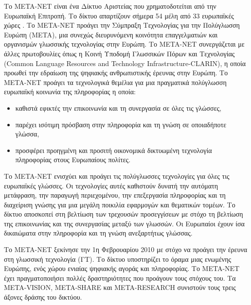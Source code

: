 \documentclass[]{../../metanetpaper}
\begin{document}
\begin{multicols}{2}
Το META-NET είναι ένα Δίκτυο Αριστείας που χρηματοδοτείται από την Ευρωπαϊκή Επιτροπή. Το δίκτυο απαρτίζουν σήμερα 54 μέλη από 33 ευρωπαϊκές χώρες \cite{rehm2011}. Το META-NET προάγει την Σύμπραξη Τεχνολογίας για την Πολύγλωσση Ευρώπη (META), μια συνεχώς διευρυνόμενη κοινότητα επαγγελματιών και οργανισμών γλωσσικής τεχνολογίας στην Ευρώπη. 
Το META-NET συνεργάζεται με άλλες πρωτοβουλίες όπως η Κοινή Υποδομή Γλωσσικών Πόρων και Τεχνολογίας (Common Language Resources and Technology Infrastructure-CLARIN), η οποία προωθεί την εδραίωση της ψηφιακής ανθρωπιστικής έρευνας στην Ευρώπη. Το META-NET προάγει τα τεχνολογικά θεμέλια για μια πραγματικά πολύγλωσση ευρωπαϊκή κοινωνία της πληροφορίας η οποία:

\begin{itemize}
\item  καθιστά εφικτές την επικοινωνία και τη συνεργασία σε όλες τις γλώσσες,
\item παρέχει ισότιμη πρόσβαση στην πληροφορία και τη γνώση σε οποιαδήποτε γλώσσα,
\item προσφέρει προηγμένη και προσιτή οικονομικά δικτυωμένη τεχνολογία πληροφορίας στους Ευρωπαίους πολίτες.
\end{itemize}

Το META-NET ενισχύει και προάγει τις πολύγλωσσες τεχνολογίες για όλες τις ευρωπαϊκές γλώσσες. Οι τεχνολογίες αυτές καθιστούν δυνατή την αυτόματη μετάφραση, την παραγωγή περιεχομένου, την επεξεργασία πληροφορίας και τη διαχείριση γνώσης για μια μεγάλη ποικιλία εφαρμογών και θεματικών τομέων. Το δίκτυο αποσκοπεί στη βελτίωση των τρεχουσών προσεγγίσεων με στόχο τη βελτίωση της επικοινωνίας και της συνεργασίας μεταξύ των γλωσσών. Οι Ευρωπαίοι έχουν ίσα δικαιώματα στην πληροφορία και τη γνώση ανεξαρτήτως γλώσσας.

Το META-NET ξεκίνησε την 1η Φεβρουαρίου 2010 με στόχο να προάγει την έρευνα στη γλωσσική τεχνολογία (ΓΤ). Το δίκτυο υποστηρίζει το  όραμα μιας ενωμένης Ευρώπης, ενός χώρου ενιαίας ψηφιακής αγοράς και πληροφορίας. Το META-NET έχει πραγματοποιήσει πολλές  δραστηριότητες που προάγουν τους στόχους του. Τα META-VISION, META-SHARE και META-RESEARCH συνιστούν τους τρεις άξονες δράσης του δικτύου. 


\end{multicols}
\end{document}
